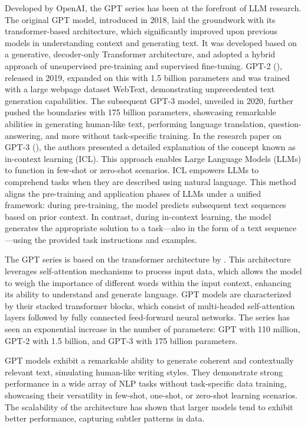 Developed by OpenAI, the GPT series has been at the forefront of LLM research.
The original GPT model, introduced in 2018, laid the groundwork with its transformer-based architecture, which significantly improved upon previous models in understanding context and generating text.
It was developed based on a generative, decoder-only Transformer architecture, and adopted a hybrid approach of unsupervised pre-training and supervised fine-tuning.
GPT-2 (\textcite{radford2019language}), released in 2019, expanded on this with 1.5 billion parameters and was trained with a large webpage dataset WebText, demonstrating unprecedented text generation capabilities.
The subsequent GPT-3 model, unveiled in 2020, further pushed the boundaries with 175 billion parameters, showcasing remarkable abilities in generating human-like text, performing language translation, question-answering, and more without task-specific training.
In the research paper on GPT-3 (\textcite{brown2020language}), the authors presented a detailed explanation of the concept known as in-context learning (ICL). This approach enables Large Language Models (LLMs) to function in few-shot or zero-shot scenarios.
ICL empowers LLMs to comprehend tasks when they are described using natural language.
This method aligns the pre-training and application phases of LLMs under a unified framework: during pre-training, the model predicts subsequent text sequences based on prior context.
In contrast, during in-context learning, the model generates the appropriate solution to a task—also in the form of a text sequence—using the provided task instructions and examples.

The GPT series is based on the transformer architecture by \textcite{vaswani2023attention}.
This architecture leverages self-attention mechanisms to process input data, which allows the model to weigh the importance of different words within the input context, enhancing its ability to understand and generate language.
GPT models are characterized by their stacked transformer blocks, which consist of multi-headed self-attention layers followed by fully connected feed-forward neural networks.
The series has seen an exponential increase in the number of parameters: GPT with 110 million, GPT-2 with 1.5 billion, and GPT-3 with 175 billion parameters.

GPT models exhibit a remarkable ability to generate coherent and contextually relevant text, simulating human-like writing styles.
They demonstrate strong performance in a wide array of NLP tasks without task-specific data training, showcasing their versatility in few-shot, one-shot, or zero-shot learning scenarios.
The scalability of the architecture has shown that larger models tend to exhibit better performance, capturing subtler patterns in data.

